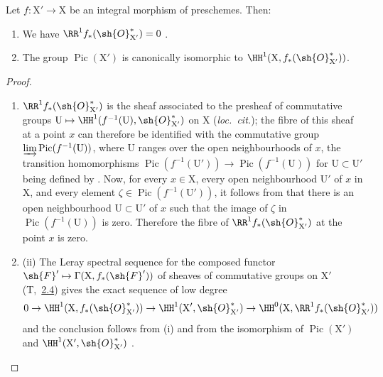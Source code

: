 \begin{corollary}[21.8.2]
\label{IV.21.8.2}
Let $f:\mathrm{X}'\to\mathrm{X}$ be an integral morphism of preschemes.
Then:
\begin{enumerate}[label=(\roman*)]
  \item We have $\RR^1 f_*(\sh{O}^*_{\mathrm{X}'})=0$ .
  \item The group $\operatorname{Pic}(\mathrm{X}')$ is canonically isomorphic to $\HH^1(\mathrm{X},f_*(\sh{O}^*_{\mathrm{X}'}))$.
\end{enumerate}
\end{corollary}

\begin{proof}
\begin{enumerate}[label=(\roman*)]
  \item $\RR^1f_*(\sh{O}^*_{\mathrm{X}'})$ is the sheaf associated to the presheaf of commutative groups $\mathrm{U}\mapsto\HH^1(f^{-1}(\mathrm{U}),\sh{O}^*_{\mathrm{X}'})$ on $\mathrm{X}$ (\emph{loc.\ cit.});
  the fibre of this sheaf at a point $x$ can therefore be identified  with the commutative group $\varinjlim\operatorname{Pic}(f^{-1}(\mathrm{U}))$, where $\mathrm{U}$ ranges over the open neighbourhoods of $x$, the transition homomorphisms $\operatorname{Pic}(f^{-1}(\mathrm{U}'))\to\operatorname{Pic}(f^{-1}(\mathrm{U}))$ for $\mathrm{U}\subset\mathrm{U}'$ being defined by .
Now, for every $x\in\mathrm{X}$, every open neighbourhood $\mathrm{U}'$ of $x$ in $\mathrm{X}$, and every element $\zeta\in\operatorname{Pic}(f^{-1}(\mathrm{U}'))$, it follows from  that there is an open neighbourhood $\mathrm{U}\subset\mathrm{U}'$ of $x$ such that the image of $\zeta$ in $\operatorname{Pic}(f^{-1}(\mathrm{U}))$ is zero.
Therefore the fibre of $\RR^1 f_*(\sh{O}^*_{\mathrm{X}'})$ at the point $x$ is zero.

  \item (ii) The Leray spectral sequence for the composed functor $\sh{F}'\mapsto\Gamma(\mathrm{X},f_*(\sh{F}'))$ of sheaves of commutative groups on $\mathrm{X}'$ (T,~{\hyperlink{ega4.c04.subsec.2-4}{2.4}}) gives the exact sequence of low degree
\[
  0\to\HH^1(\mathrm{X},f_*(\sh{O}^*_{\mathrm{X}'}))\to\HH^1(\mathrm{X}',\sh{O}^*_{\mathrm{X}'})\to\HH^0(\mathrm{X},\RR^1 f_*(\sh{O}^*_{\mathrm{X}'}))
\]
and the conclusion follows from (i) and from the isomorphism of $\operatorname{Pic}(\mathrm{X}')$ and $\HH^1(\mathrm{X}',\sh{O}^*_{\mathrm{X}'})$ .
\end{enumerate}
\end{proof}

